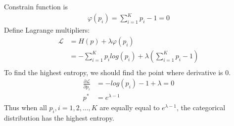 \documentclass{article}
\begin{document}
\begin{itemize}
Constrain function is
\begin{align*}
    \varphi (p_{i}) = \sum_{i = 1}^K p_{i} - 1= 0
\end{align*}
Define Lagrange multipliers:\\
\begin{align*}
    \mathcal{L} &= H(p) + \lambda \varphi(p_{i})\\
    &= -\sum_{i = 1}^K p_{i}log(p_{i}) + \lambda (\sum_{i = 1}^K p_{i} - 1)\\
\end{align*}
To find the highest entropy, we should find the point where derivative is 0.\\
\begin{align*}
    \frac{\partial \mathcal{L}}{\partial p_{i}} &= -log(p_{i}) - 1 + \lambda = 0\\
    p^* &= e^{\lambda - 1}
\end{align*}
Thus when all $p_{i}, i = 1, 2, ..., K$ are equally equal to $e^{\lambda - 1}$, the categorical distribution has the highest entropy.
\end{itemize} 
\end{document}
